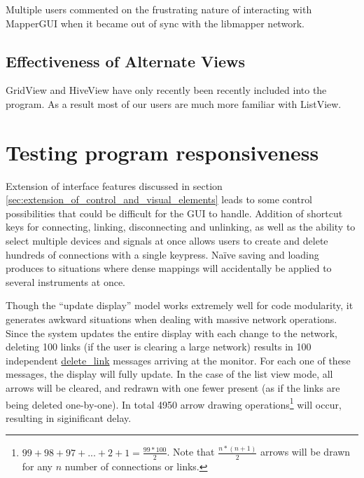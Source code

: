 Multiple users commented on the frustrating nature of interacting with MapperGUI when it became out of sync with the libmapper network. 
	

	\subsection{Effectiveness of Alternate Views} %
	\label{sub:effectiveness_of_alternate_views}

GridView and HiveView have only recently been recently included into the program. As a result most of our users are much more familiar with ListView. 
	
	

\section{Testing program responsiveness} %
\label{sec:testing_program_responsiveness}

Extension of interface features discussed in section \ref{sec:extension_of_control_and_visual_elements} leads to some control possibilities that could be difficult for the GUI to handle. Addition of shortcut keys for connecting, linking, disconnecting and unlinking, as well as the ability to select multiple devices and signals at once allows users to create and delete hundreds of connections with a single keypress. Na\"{i}ve saving and loading produces to situations where dense mappings will accidentally be applied to several instruments at once.

Though the ``update display'' model works extremely well for code modularity, it generates awkward situations when dealing with massive network operations. Since the system updates the entire display with each change to the network, deleting 100 links (if the user is clearing a large network) results in 100 independent \url{delete_link} messages arriving at the monitor. For each one of these messages, the display will fully update. In the case of the list view mode, all arrows will be cleared, and redrawn with one fewer present (as if the links are being deleted one-by-one). In total 4950 arrow drawing operations\footnote{$99 + 98 + 97 + ... + 2 + 1 = \frac{99*100}{2}$. Note that $\frac{n*(n+1)}{2}$ arrows will be drawn for any $n$ number of connections or links.} will occur, resulting in siginificant delay. 


